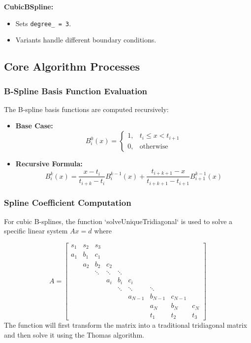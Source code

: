 \documentclass[a4paper]{article}
\begin{document}
\textbf{CubicBSpline:}
\begin{itemize}
    \item Sets \texttt{degree\_ = 3}.
    \item Variants handle different boundary conditions.
\end{itemize}

\subsection{Core Algorithm Processes}

\subsubsection{B-Spline Basis Function Evaluation}

The B-spline basis functions are computed recursively:

\begin{itemize}
    \item \textbf{Base Case:}
    \[
    B^0_i(x) = 
    \begin{cases} 
    1, & t_i \leq x < t_{i+1} \\
    0, & \text{otherwise}
    \end{cases}
    \]
    \item \textbf{Recursive Formula:}
    \[
    B^k_i(x) = \frac{x - t_i}{t_{i+k} - t_i} B^{k-1}_i(x) + \frac{t_{i+k+1} - x}{t_{i+k+1} - t_{i+1}} B^{k-1}_{i+1}(x)
    \]
\end{itemize}

\subsubsection{Spline Coefficient Computation}
For cubic B-splines, the function `solveUniqueTridiagonal` is used to solve a specific linear system \(Ax=d\) where

\[
A = 
\begin{bmatrix}
s_1 & s_2 & s_3 &  &  &  &  &  \\
a_1 & b_1 & c_1 &  &  &  &  &  \\
 & a_2 & b_2 & c_2 &  &  &  &  \\
 &  & \ddots & \ddots & \ddots &  &  &  \\
 &  &  & a_i & b_i & c_i &  &  \\
 &  &  &  & \ddots & \ddots & \ddots &  \\
 &  &  &  &  & a_{N-1} & b_{N-1} & c_{N-1} \\
 &  &  &  &  &  & a_N & b_N & c_N \\
 &  &  &  &  &  & t_1 & t_2 & t_3
\end{bmatrix}
\]
The function will first transform the matrix into a traditional tridiagonal matrix and then solve it using the Thomas algorithm.
\end{document}
